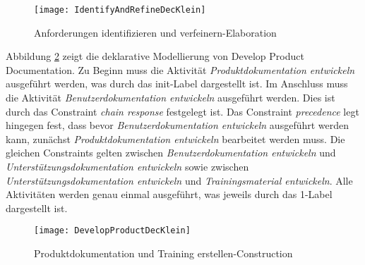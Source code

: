 \begin{figure}[h]
\begin{center}
  \texttt{[image: IdentifyAndRefineDecKlein]} %
  \caption{Anforderungen identifizieren und verfeinern-Elaboration}
  \label{fig:IdentifyAndRefineDecKlein}
\end{center}
\end{figure}



Abbildung \ref{fig:DevelopProductDecKlein} zeigt die deklarative Modellierung von Develop Product Documentation.\newline
Zu Beginn muss die Aktivität \textit{Produktdokumentation entwickeln} ausgeführt werden, was durch das init-Label dargestellt ist. Im Anschluss muss die Aktivität \textit{Benutzerdokumentation entwickeln} ausgeführt werden. Dies ist durch das Constraint \textit{chain response} festgelegt ist. Das Constraint \textit{precedence} legt hingegen fest, dass bevor \textit{Benutzerdokumentation entwickeln} ausgeführt werden kann, zunächst \textit{Produktdokumentation entwickeln} bearbeitet werden muss. Die gleichen Constraints gelten zwischen \textit{Benutzerdokumentation entwickeln} und \textit{Unterstützungsdokumentation entwickeln} sowie zwischen \textit{Unterstützungsdokumentation entwickeln} und \textit{Trainingsmaterial entwickeln}. Alle Aktivitäten werden genau einmal ausgeführt, was jeweils durch das 1-Label dargestellt ist. 

\begin{figure}[htp]
\begin{center}
  \texttt{[image: DevelopProductDecKlein]} %
  \caption{Produktdokumentation und Training erstellen-Construction}
  \label{fig:DevelopProductDecKlein}
\end{center}
\end{figure}

